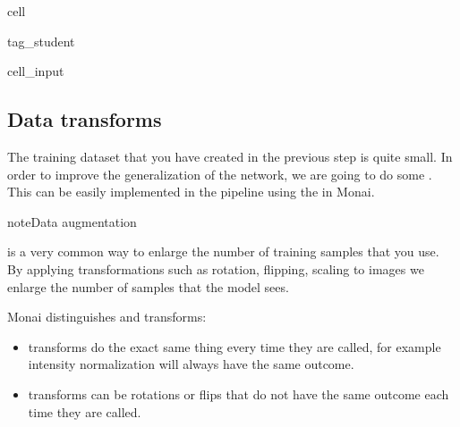 \documentclass[letterpaper,10pt,english]{jupyterBook}
\begin{document}
\begin{sphinxuseclass}{cell}
\begin{sphinxuseclass}{tag_student}\begin{sphinxVerbatimInput}

\begin{sphinxuseclass}{cell_input}
\begin{sphinxVerbatim}[commandchars=\\\{\}]
\end{sphinxVerbatim}

\end{sphinxuseclass}\end{sphinxVerbatimInput}

\end{sphinxuseclass}
\end{sphinxuseclass}

\subsection{Data transforms}
\label{\detokenize{notebooks/Tutorial3_Segmentation/Tutorial3_Segmentation_student:data-transforms}}
\sphinxAtStartPar
The training dataset that you have created in the previous step is quite small. In order to improve the generalization of the network, we are going to do some . This can be easily implemented in the pipeline using the  in Monai.

\begin{sphinxadmonition}{note}{Data augmentation}

\sphinxAtStartPar
{} is a very common way to enlarge the number of training samples that you use. By applying transformations such as rotation, flipping, scaling to images we  enlarge the number of samples that the model sees.
\end{sphinxadmonition}

\sphinxAtStartPar
Monai distinguishes  and  transforms:
\begin{itemize}
\item {} 
\sphinxAtStartPar
{} transforms do the exact same thing every time they are called, for example intensity normalization will always have the same outcome.

\item {} 
\sphinxAtStartPar
{} transforms can be rotations or flips that do not have the same outcome each time they are called.

\end{itemize}
\end{document}
